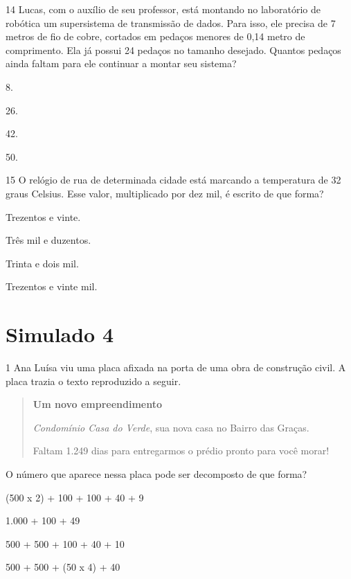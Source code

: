 \begin{mdframed}[linewidth=2pt,linecolor=salmao,roundcorner=2pt]
\begin{escolha}
{\begin{escolha}
\num{14} Lucas, com o auxílio de seu professor, está montando no laboratório de
robótica um supersistema de transmissão de dados. Para isso, ele
precisa de 7 metros de fio de cobre, cortados em pedaços menores de 0,14
metro de comprimento. Ela já possui 24 pedaços no tamanho desejado. Quantos pedaços ainda
faltam para ele continuar a montar seu sistema?

\begin{escolha}
\item
  8.
\item
  26.
\item
  42.
\item
  50.
\end{escolha}


\num{15} O relógio de rua de determinada cidade está marcando a temperatura
de 32 graus Celsius. Esse valor, multiplicado por dez mil, é escrito de que forma?

\begin{escolha}
\item Trezentos e vinte.
\item Três mil e duzentos.
\item Trinta e dois mil.
\item Trezentos e vinte mil.
\end{escolha}


\chapter{Simulado 4}

\num{1} Ana Luísa viu uma placa afixada na porta de uma obra de construção civil. A placa trazia o texto reproduzido a seguir.

\begin{quote}
\textbf{Um novo empreendimento}

\textit{Condomínio Casa do Verde}, sua nova casa no Bairro das Graças.

Faltam 1.249 dias para entregarmos o prédio pronto para você morar!
\end{quote}

O número que aparece nessa placa pode ser decomposto de que forma?

\begin{escolha}
\item (500 x 2) + 100 + 100 + 40 + 9
\item 1.000 + 100 + 49  
\item 500 + 500 + 100 + 40 + 10  
\item 500 + 500 + (50 x 4) + 40  
\end{escolha}


\end{escolha}}
\end{escolha}
\end{mdframed}
